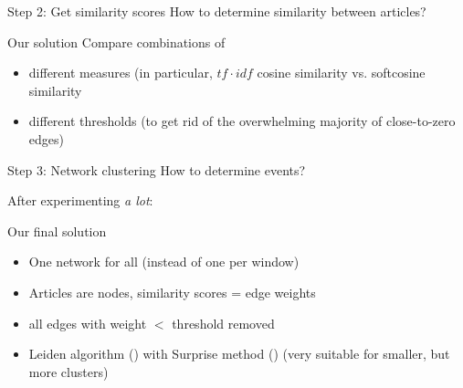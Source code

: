 \begin{frame}{Step 2: Get similarity scores}
  How to determine similarity between articles?
  \begin{block}{Our solution}
  Compare combinations of 
  \begin{itemize}
  \item different measures (in particular, $tf\cdot idf$ cosine similarity vs. softcosine similarity
  \item different thresholds (to get rid of the overwhelming majority of close-to-zero edges) 
  \end{itemize}
\end{block}
\end{frame}


\begin{frame}{Step 3: Network clustering}
  How to determine events?

  After experimenting \emph{a lot}:
	
  \begin{block}{Our final solution}
    \begin{itemize}
    \item One network for all (instead of one per window)
    \item Articles are nodes, similarity scores = edge weights
    \item all edges with weight $<$ threshold removed
    \item Leiden algorithm (\cite{Traag2019}) with Surprise method (\cite{Traag2015}) (very suitable for smaller, but more clusters)
    \end{itemize}
  \end{block}
  
\end{frame}


